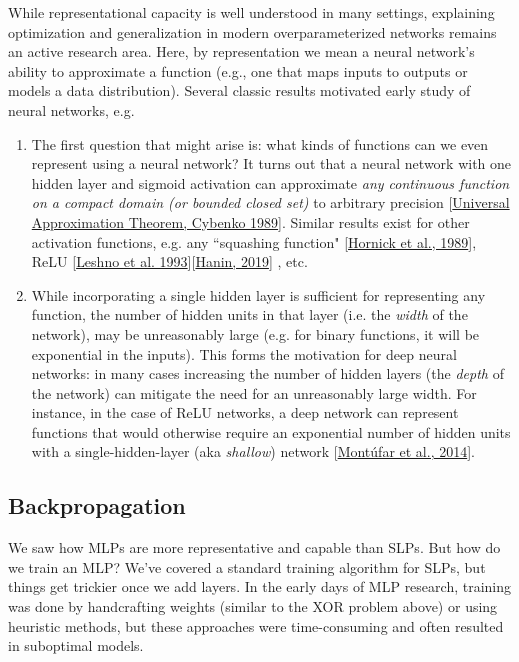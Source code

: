 \documentclass{article}
\begin{document}
While representational capacity is well understood in many settings, explaining optimization and generalization in modern overparameterized networks remains an active research area. Here, by representation we mean a neural network’s ability to approximate a function (e.g., one that maps inputs to outputs or models a data distribution). Several classic results motivated early study of neural networks, e.g.
\begin{enumerate}
    \item The first question that might arise is: what kinds of functions can we even represent using a neural network? It turns out that a neural network with one hidden layer and sigmoid activation can approximate \textit{any continuous function on a compact domain (or bounded closed set)} to arbitrary precision [\href{https://doi.org/10.1007/BF02551274}{Universal Approximation Theorem, Cybenko 1989}]. Similar results exist for other activation functions, e.g. any ``squashing function" [\href{https://doi.org/10.1016/0893-6080(89)90020-8}{Hornick et al., 1989}], ReLU [\href{https://doi.org/10.1016/S0893-6080(05)80131-5}{Leshno et al. 1993}][\href{https://www.mdpi.com/2227-7390/7/10/992}{Hanin, 2019}] , etc.
    \item While incorporating a single hidden layer is sufficient for representing any function, the number of hidden units in that layer (i.e. the \textit{width} of the network), may be unreasonably large (e.g. for binary functions, it will be exponential in the inputs). This forms the motivation for deep neural networks: in many cases increasing the number of hidden layers (the \textit{depth} of the network) can mitigate the need for an unreasonably large width. For instance, in the case of ReLU networks, a deep network can represent functions that would otherwise require an exponential number of hidden units with a single-hidden-layer (aka \textit{shallow}) network [\href{https://arxiv.org/abs/1402.1869}{Mont\'ufar et al., 2014}].
\end{enumerate}

\subsection{Backpropagation}
We saw how MLPs are more representative and capable than SLPs. But how do we train an MLP? We've covered a standard training algorithm for SLPs, but things get trickier once we add layers. In the early days of MLP research, training was done by handcrafting weights (similar to the XOR problem above) or using heuristic methods, but these approaches were time-consuming and often resulted in suboptimal models. 
\end{document}
